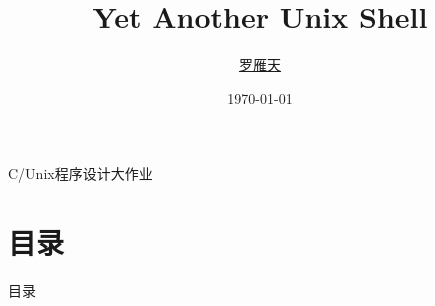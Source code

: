 \documentclass[10pt]{beamer}
\title{Yet Another Unix Shell }
\author{\href{mailto:luoyt14thu@gmail.com}{罗雁天}}
\date{\today}
\begin{document}
\begin{frame}{C/Unix程序设计大作业}
\titlepage
\end{frame}

\section*{目录}
\begin{frame}{目录}
\tableofcontents
\end{frame}
\end{document}
